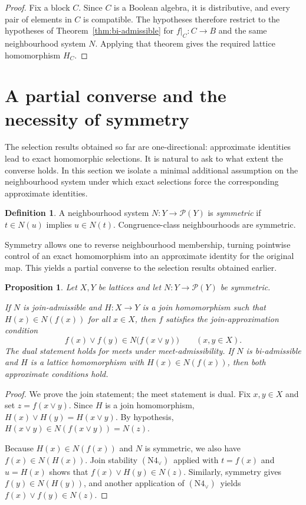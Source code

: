 \documentclass[11pt]{amsart}
\newtheorem{proposition}[theorem]{Proposition}
\theoremstyle{definition}
\newtheorem{definition}[theorem]{Definition}
\newcommand{\join}{\vee}
\newcommand{\Pow}{\mathcal{P}}
\newcommand{\NFourJoin}{\ensuremath{\mathrm{(N4_{\vee})}}}
\begin{document}
\begin{proof}
Fix a block $C$.
Since $C$ is a Boolean algebra, it is distributive, and every pair of elements in $C$ is compatible.
The hypotheses therefore restrict to the hypotheses of Theorem~\ref{thm:bi-admissible} for $f|_C\colon C\to B$ and the same neighbourhood system $N$.
Applying that theorem gives the required lattice homomorphism $H_C$.
\end{proof}

\section{A partial converse and the necessity of symmetry}
The selection results obtained so far are one-directional: approximate identities lead to
exact homomorphic selections.
It is natural to ask to what extent the converse holds.
In this section we isolate a minimal additional assumption on the neighbourhood system
under which exact selections force the corresponding approximate identities.

\begin{definition}\label{def:symmetric}
A neighbourhood system $N\colon Y\to\Pow(Y)$ is \emph{symmetric} if $t\in N(u)$ implies $u\in N(t)$.
Congruence-class neighbourhoods are symmetric.
\end{definition}
Symmetry allows one to reverse neighbourhood membership, turning pointwise control of an
exact homomorphism into an approximate identity for the original map.
This yields a partial converse to the selection results obtained earlier.

\begin{proposition}\label{prop:partial-converse}
Let $X,Y$ be lattices and let $N\colon Y\to\Pow(Y)$ be symmetric.

If $N$ is join-admissible and $H\colon X\to Y$ is a join homomorphism such that $H(x)\in N(f(x))$ for all $x\in X$,
then $f$ satisfies the join-approximation condition
\[
f(x)\join f(y)\in N\bigl(f(x\join y)\bigr)\qquad(x,y\in X).
\]
The dual statement holds for meets under meet-admissibility.
If $N$ is bi-admissible and $H$ is a lattice homomorphism with $H(x)\in N(f(x))$, then both approximate conditions hold.
\end{proposition}

\begin{proof}
We prove the join statement; the meet statement is dual.
Fix $x,y\in X$ and set $z=f(x\join y)$.
Since $H$ is a join homomorphism, $H(x)\join H(y)=H(x\join y)$.
By hypothesis, $H(x\join y)\in N(f(x\join y))=N(z)$.

Because $H(x)\in N(f(x))$ and $N$ is symmetric, we also have $f(x)\in N(H(x))$.
Join stability \NFourJoin\ applied with $t=f(x)$ and $u=H(x)$ shows that
$f(x)\join H(y)\in N(z)$.
Similarly, symmetry gives $f(y)\in N(H(y))$, and another application of \NFourJoin\ yields
$f(x)\join f(y)\in N(z)$.
\end{proof}
\end{document}
